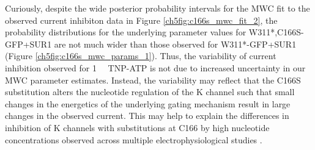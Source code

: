 Curiously, despite the wide posterior probability intervals for the MWC fit to the observed current inhibiton data in Figure \ref{ch5fig:c166s_mwc_fit_2}, the probability distributions for the underlying parameter values for W311*,C166S-GFP+SUR1 are not much wider than those observed for W311*-GFP+SUR1 (Figure \ref{ch5fig:c166s_mwc_params_1}).
Thus, the variability of current inhibition observed for \SI{1}{\milli\Molar} TNP-ATP is not due to increased uncertainty in our MWC parameter estimates.
Instead, the variability may reflect that the C166S substitution alters the nucleotide regulation of the K\ATP{} channel such that small changes in the energetics of the underlying gating mechanism result in large changes in the observed current.
This may help to explain the differences in inhibition of K\ATP{} channels with substitutions at C166 by high nucleotide concentrations observed across multiple electrophysiological studies \cite{trapp_mechanism_1998, enkvetchakul_atp_2001-1, ribalet_atp-sensitive_2006-1, yang_palmitoylation_2020}.

